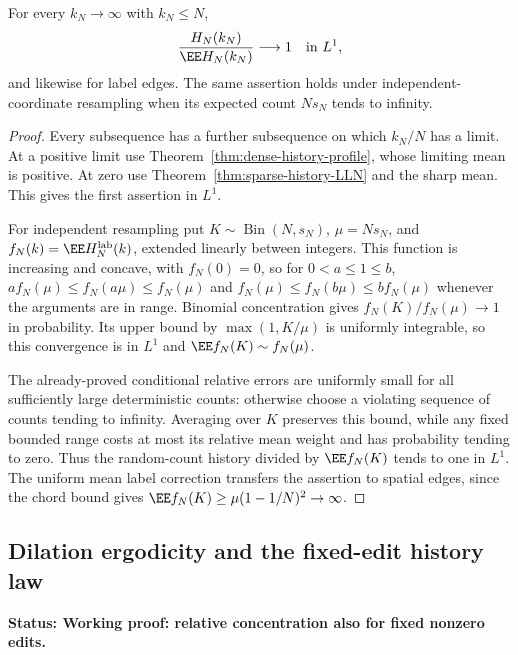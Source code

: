 \documentclass[11pt,letterpaper]{article}
\newcommand{\status}[1]{\textbf{Status: #1.}}
\begin{document}
\begin{corollary}
\label{cor:all-growing-history-concentration}
For every $k_N\to\infty$ with $k_N\le N$,
\[
 \frac{H_N(k_N)}{\EE H_N(k_N)}\longrightarrow1
                                      \quad\hbox{in }L^1,
\]
and likewise for label edges. The same assertion holds under
independent-coordinate resampling when its expected count $Ns_N$
tends to infinity.
\end{corollary}
\begin{proof}
Every subsequence has a further subsequence on which $k_N/N$ has
a limit. At a positive limit use
Theorem~\ref{thm:dense-history-profile}, whose limiting mean is
positive. At zero use Theorem~\ref{thm:sparse-history-LLN} and the
sharp mean. This gives the first assertion in $L^1$.

For independent resampling put $K\sim\operatorname{Bin}(N,s_N)$,
$\mu=Ns_N$, and $f_N(k)=\EE H_N^{\rm lab}(k)$, extended linearly
between integers. This function is increasing and concave, with
$f_N(0)=0$, so for $0<a\le1\le b$,
$a f_N(\mu)\le f_N(a\mu)\le f_N(\mu)$ and
$f_N(\mu)\le f_N(b\mu)\le b f_N(\mu)$ whenever the arguments are
in range. Binomial concentration gives $f_N(K)/f_N(\mu)\to1$
in probability. Its upper bound by $\max(1,K/\mu)$ is uniformly
integrable, so this convergence is in $L^1$ and
$\EE f_N(K)\sim f_N(\mu)$.

The already-proved conditional relative errors are uniformly small
for all sufficiently large deterministic counts: otherwise choose
a violating sequence of counts tending to infinity. Averaging over
$K$ preserves this bound, while any fixed bounded range costs at
most its relative mean weight and has probability tending to zero.
Thus the random-count history divided by $\EE f_N(K)$ tends to one
in $L^1$. The uniform mean label correction transfers the assertion
to spatial edges, since the chord bound gives
$\EE f_N(K)\ge\mu(1-1/N)^2\to\infty$.
\end{proof}

\subsection{Dilation ergodicity and the fixed-edit history law}
\label{sec:fixed-history-LLN}

\status{Working proof: relative concentration also for fixed nonzero edits}
\end{document}
